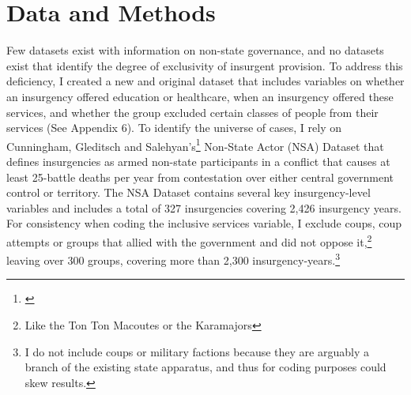 \documentclass[12pt, letterpaper]{article}
\begin{document}





\section*{Data and Methods}

Few datasets exist with information on non-state governance, and no datasets exist that identify the degree of exclusivity of insurgent provision. To address this deficiency, I created a new and original dataset that includes variables on whether an insurgency offered education or healthcare, when an insurgency offered these services, and whether the group excluded certain classes of people from their services (See Appendix 6). To identify the universe of cases, I rely on Cunningham, Gleditsch and Salehyan's\footnote{\citealt{cunningham2009takes}} Non-State Actor (NSA) Dataset that defines insurgencies as armed non-state participants in a conflict that causes at least 25-battle deaths per year from contestation over either central government control or territory. The NSA Dataset contains several key insurgency-level variables and includes a total of 327 insurgencies covering 2,426 insurgency years. For consistency when coding the inclusive services variable, I exclude coups, coup attempts or groups that allied with the government and did not oppose it,\footnote{Like the Ton Ton Macoutes or the Karamajors} leaving over 300 groups, covering more than 2,300 insurgency-years.\footnote{I do not include coups or military factions because they are arguably a branch of the existing state apparatus, and thus for coding purposes could skew results.}
\end{document}
